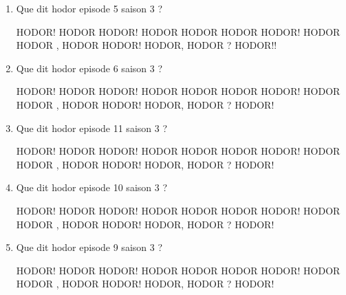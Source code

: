 \documentclass[a4paper, 11pt]{article}
\begin{document}
\begin{qcm}
\begin{enumerate}
			\item Que dit hodor episode 5 saison 3 ?
			\begin{tabenum} [1)]
				\tabenumitem HODOR!
				\tabenumitem HODOR HODOR!
				\tabenumitem HODOR HODOR HODOR HODOR!
				\tabenumitem HODOR HODOR , HODOR HODOR!
				\tabenumitem HODOR, HODOR ? HODOR!!
			\end{tabenum}
		\vspace{5mm}

			\item Que dit hodor episode 6 saison 3 ?
			\begin{tabenum} [1)]
				\tabenumitem HODOR!
				\tabenumitem HODOR HODOR!
				\tabenumitem HODOR HODOR HODOR HODOR!
				\tabenumitem HODOR HODOR , HODOR HODOR!
				\tabenumitem HODOR, HODOR ? HODOR!
			\end{tabenum}
		\vspace{5mm}

			\item Que dit hodor episode 11 saison 3 ?
			\begin{tabenum} [1)]
				\tabenumitem HODOR!
				\tabenumitem HODOR HODOR!
				\tabenumitem HODOR HODOR HODOR HODOR!
				\tabenumitem HODOR HODOR , HODOR HODOR!
				\tabenumitem HODOR, HODOR ? HODOR!
			\end{tabenum}
		\vspace{5mm}

			\item Que dit hodor episode 10 saison 3 ?
			\begin{tabenum} [1)]
				\tabenumitem HODOR!
				\tabenumitem HODOR HODOR!
				\tabenumitem HODOR HODOR HODOR HODOR!
				\tabenumitem HODOR HODOR , HODOR HODOR!
				\tabenumitem HODOR, HODOR ? HODOR!
			\end{tabenum}
		\vspace{5mm}

			\item Que dit hodor episode 9 saison 3 ?
			\begin{tabenum} [1)]
				\tabenumitem HODOR!
				\tabenumitem HODOR HODOR!
				\tabenumitem HODOR HODOR HODOR HODOR!
				\tabenumitem HODOR HODOR , HODOR HODOR!
				\tabenumitem HODOR, HODOR ? HODOR!
			\end{tabenum}
		\vspace{5mm}

		\end{enumerate}
	\end{qcm}
\end{document}
